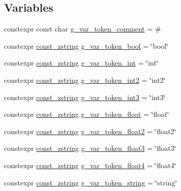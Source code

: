 \subsection*{Variables}
\begin{DoxyCompactItemize}
\item 
constexpr const char \hyperlink{namespacemage_1_1loader_a51fd34b486dfe1d203f7c7b897b2fd2c}{g\+\_\+var\+\_\+token\+\_\+comment} = \textquotesingle{}\#\textquotesingle{}
\item 
constexpr \hyperlink{namespacemage_abfd9206dc607ceb5d13ec68bf075a5c0}{const\+\_\+zstring} \hyperlink{namespacemage_1_1loader_a0457a884e6f6cd7228676907e829575b}{g\+\_\+var\+\_\+token\+\_\+bool} = \char`\"{}bool\char`\"{}
\item 
constexpr \hyperlink{namespacemage_abfd9206dc607ceb5d13ec68bf075a5c0}{const\+\_\+zstring} \hyperlink{namespacemage_1_1loader_aa147b458d6b9bbe4b481df6468027055}{g\+\_\+var\+\_\+token\+\_\+int} = \char`\"{}int\char`\"{}
\item 
constexpr \hyperlink{namespacemage_abfd9206dc607ceb5d13ec68bf075a5c0}{const\+\_\+zstring} \hyperlink{namespacemage_1_1loader_a56b5eb839752f752fe25139e893d02d5}{g\+\_\+var\+\_\+token\+\_\+int2} = \char`\"{}int2\char`\"{}
\item 
constexpr \hyperlink{namespacemage_abfd9206dc607ceb5d13ec68bf075a5c0}{const\+\_\+zstring} \hyperlink{namespacemage_1_1loader_a6d17673197d2bb9487c8c874a741da8f}{g\+\_\+var\+\_\+token\+\_\+int3} = \char`\"{}int3\char`\"{}
\item 
constexpr \hyperlink{namespacemage_abfd9206dc607ceb5d13ec68bf075a5c0}{const\+\_\+zstring} \hyperlink{namespacemage_1_1loader_aa53b6d14e0550f8bc69f9383658abe4a}{g\+\_\+var\+\_\+token\+\_\+float} = \char`\"{}float\char`\"{}
\item 
constexpr \hyperlink{namespacemage_abfd9206dc607ceb5d13ec68bf075a5c0}{const\+\_\+zstring} \hyperlink{namespacemage_1_1loader_aa28f34682195162b5274c767b2221b41}{g\+\_\+var\+\_\+token\+\_\+float2} = \char`\"{}float2\char`\"{}
\item 
constexpr \hyperlink{namespacemage_abfd9206dc607ceb5d13ec68bf075a5c0}{const\+\_\+zstring} \hyperlink{namespacemage_1_1loader_a791abcdb5a1a298a02b2a1ea0d7d44c9}{g\+\_\+var\+\_\+token\+\_\+float3} = \char`\"{}float3\char`\"{}
\item 
constexpr \hyperlink{namespacemage_abfd9206dc607ceb5d13ec68bf075a5c0}{const\+\_\+zstring} \hyperlink{namespacemage_1_1loader_a090338735c82aa00b47b04740d53bdcd}{g\+\_\+var\+\_\+token\+\_\+float4} = \char`\"{}float4\char`\"{}
\item 
constexpr \hyperlink{namespacemage_abfd9206dc607ceb5d13ec68bf075a5c0}{const\+\_\+zstring} \hyperlink{namespacemage_1_1loader_a653c16a1fffe8a8f00cc11923d6243a8}{g\+\_\+var\+\_\+token\+\_\+string} = \char`\"{}string\char`\"{}
\end{DoxyCompactItemize}


